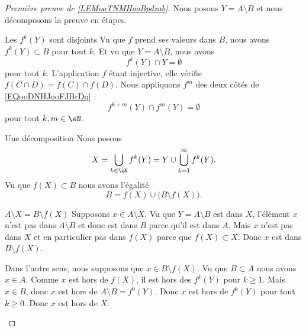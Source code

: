 \begin{proof}[Première preuve de \ref{LEMooTNMHooBpdzab}]
    Nous posons \( Y=A\setminus B\) et nous décomposons la preuve en étapes.
    \begin{subproof}
        \item[Les \( f^k(Y)\) sont disjoints]
            Vu que \( f\) prend ses valeurs dans \( B\), nous avons \( f^k(Y)\subset B\) pour tout \( k\). Et vu que \( Y=A\setminus B\), nous avons
            \begin{equation}        \label{EQooDNHJooFJBrDq}
                f^k(Y)\cap Y=\emptyset
            \end{equation}
            pour tout \( k\). L'application \( f\) étant injective, elle vérifie \( f(C\cap D)=f(C)\cap f(D)\). Nous appliquons \( f^m\) des deux côtés de \eqref{EQooDNHJooFJBrDq} :
            \begin{equation}
                f^{k+m}(Y)\cap f^m(Y)=\emptyset
            \end{equation}
            pour tout \( k,m\in \eN\).
        \item[Une décomposition] 
            Nous posons
            \begin{equation}
                X=\bigcup_{k\in \eN}f^k(Y)=Y\cup\bigcup_{k=1}^{\infty}f^k(Y).
            \end{equation}
            Vu que \( f(X)\subset B\) nous avons l'égalité
            \begin{equation}
                B=f(X)\cup\big(B\setminus f(X)\big).
            \end{equation}
        \item[\( A\setminus X=B\setminus f(X)\)]
            Supposons \( x\in A\setminus X\). Vu que \( Y=A\setminus B\) est dans \( X\), l'élément \( x\) n'est pas dans \( A\setminus B\) et donc est dans \( B\) parce qu'il est dans \( A\). Mais \( x\) n'est pas dans \( X\) et en particulier pas dans \( f(X)\) parce que \( f(X)\subset X\). Donc \( x\) est dans \( B\setminus f(X)\).

            Dans l'autre sens, nous supposons que \( x\in B\setminus f(X)\). Vu que \( B\subset A\) nous avons \( x\in A\). Comme \( x\) est hors de \( f(X)\), il est hors des \( f^k(Y)\) pour \( k\geq 1\). Mais \( x\in B\), donc \( x\) est hors de \( A\setminus B=f^0(Y)\). Donc \( x\) est hors de \( f^k(Y)\) pour tout \( k\geq 0\). Donc \( x\) est hors de \( X\).


\end{subproof}
\end{proof}
